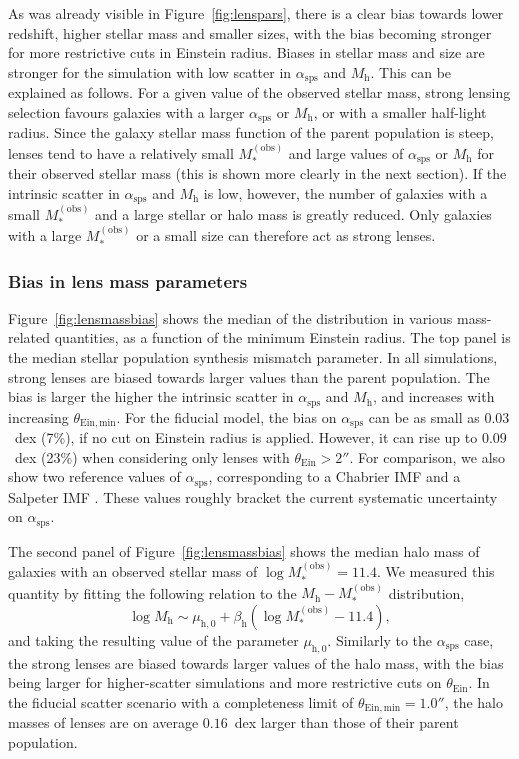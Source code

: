\documentclass{aa}
\def\asps{\alpha_{\mathrm{sps}}}
\def\mobs{M_*^{(\mathrm{obs})}}
\def\mhalo{M_{\mathrm{h}}}
\def\tein{\theta_{\mathrm{Ein}}}
\def\Fref#1{Figure~\ref{#1}\xspace}
\begin{document}
As was already visible in \Fref{fig:lenspars}, there is a clear bias towards lower redshift, higher stellar mass and smaller sizes, with the bias becoming stronger for more restrictive cuts in Einstein radius.
Biases in stellar mass and size are stronger for the simulation with low scatter in $\asps$ and $\mhalo$.
This can be explained as follows.
For a given value of the observed stellar mass, strong lensing selection favours galaxies with a larger $\asps$ or $\mhalo$, or with a smaller half-light radius.
Since the galaxy stellar mass function of the parent population is steep, lenses tend to have a relatively small $\mobs$ and large values of $\asps$ or $\mhalo$ for their observed stellar mass (this is shown more clearly in the next section).
If the intrinsic scatter in $\asps$ and $\mhalo$ is low, however, the number of galaxies with a small $\mobs$ and a large stellar or halo mass is greatly reduced.
Only galaxies with a large $\mobs$ or a small size can therefore act as strong lenses.

\subsubsection{Bias in lens mass parameters}

\Fref{fig:lensmassbias} shows the median of the distribution in various mass-related quantities, as a function of the minimum Einstein radius.
The top panel is the median stellar population synthesis mismatch parameter.
In all simulations, strong lenses are biased towards larger values than the parent population. The bias is larger the higher the intrinsic scatter in $\asps$ and $\mhalo$, and increases with increasing $\theta_{\mathrm{Ein,min}}$.
For the fiducial model, the bias on $\asps$ can be as small as $0.03$~dex (7\%), if no cut on Einstein radius is applied.
However, it can rise up to $0.09$~dex (23\%) when considering only lenses with $\tein > 2''$.
For comparison, we also show two reference values of $\asps$, corresponding to a Chabrier IMF \citep{Cha03} and a Salpeter IMF \citep{Sal55}.
These values roughly bracket the current systematic uncertainty on $\asps$.

The second panel of \Fref{fig:lensmassbias} shows the median halo mass of galaxies with an observed stellar mass of $\log{\mobs}=11.4$.
We measured this quantity by fitting the following relation to the $\mhalo-\mobs$ distribution,
\begin{equation}
\log{\mhalo} \sim \mu_{\mathrm{h},0} + \beta_{\mathrm{h}}(\log{\mobs} - 11.4),
\end{equation}
and taking the resulting value of the parameter $\mu_{\mathrm{h},0}$.
Similarly to the $\asps$ case, the strong lenses are biased towards larger values of the halo mass, with the bias being larger for higher-scatter simulations and more restrictive cuts on $\tein$.
In the fiducial scatter scenario with a completeness limit of $\theta_{\mathrm{Ein,min}}=1.0''$, the halo masses of lenses are on average $0.16$~dex larger than those of their parent population.
\end{document}
